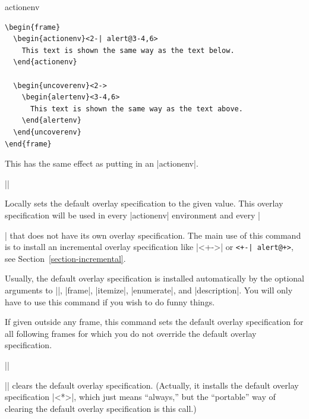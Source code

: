 \begin{original...}
\begin{environment}{{actionenv}}
  \example
\begin{verbatim}
\begin{frame}
  \begin{actionenv}<2-| alert@3-4,6>
    This text is shown the same way as the text below.
  \end{actionenv}

  \begin{uncoverenv}<2->
    \begin{alertenv}<3-4,6>
      This text is shown the same way as the text above.
    \end{alertenv}
  \end{uncoverenv}
\end{frame}
\end{verbatim}
\end{environment}

\begin{command}{\action{}}
  This has the same effect as putting  in an |actionenv|.
  
  \example
  ||
\end{command}

\begin{command}{\beamerdefaultoverlayspecification{}}
  Locally sets the default overlay specification to the given value. This overlay specification will be used in every |actionenv| environment and every |\item| that does not have its own overlay specification. The main use of this command is to install an incremental overlay specification like |<+->| or \verb/<+-| alert@+>/, see Section~\ref{section-incremental}.

  Usually, the default overlay specification is installed automatically by the optional arguments to |\frame|, |frame|, |itemize|, |enumerate|, and |description|. You will only have to use this command if you wish to do funny things.

  If given outside any frame, this command sets the default overlay specification for all following frames for which you do not override the default overlay specification.

  \example
  |\beamerdefaultoverlayspecification{<+->}|

  \example
  |\beamerdefaultoverlayspecification{}| clears the default overlay specification. (Actually, it installs the default overlay specification |<*>|, which just means ``always,'' but the ``portable'' way of clearing the default overlay specification is this call.)
\end{command}


\end{original...}
